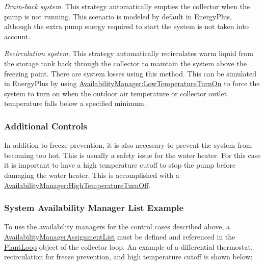 \emph{Drain-back system}. This strategy automatically empties the collector when the pump is not running. This scenario is modeled by default in EnergyPlus, although the extra pump energy required to start the system is not taken into account.

\emph{Recirculation system}. This strategy automatically recirculates warm liquid from the storage tank back through the collector to maintain the system above the freezing point. There are system losses using this method. This can be simulated in EnergyPlus by using \hyperref[availabilitymanagerlowtemperatureturnon]{AvailabilityManager:LowTemperatureTurnOn} to force the system to turn on when the outdoor air temperature or collector outlet temperature falls below a specified minimum.

\subsubsection{Additional Controls}\label{additional-controls}

In addition to freeze prevention, it is also necessary to prevent the system from becoming too hot. This is usually a safety issue for the water heater. For this case it is important to have a high temperature cutoff to stop the pump before damaging the water heater. This is accomplished with a \hyperref[availabilitymanagerhightemperatureturnoff]{AvailabilityManager:HighTemperatureTurnOff}.

\subsubsection{System Availability Manager List Example}\label{system-availability-manager-list-example}

To use the availability managers for the control cases described above, a \hyperref[availabilitymanagerassignmentlist]{AvailabilityManagerAssignmentList} must be defined and referenced in the \hyperref[plantloop]{PlantLoop} object of the collector loop. An example of a differential thermostat, recirculation for freeze prevention, and high temperature cutoff is shown below:

